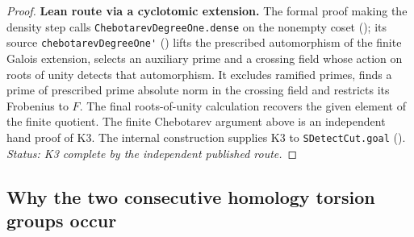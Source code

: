 \begin{proof}
\par\noindent\textbf{Lean route via a cyclotomic extension.} 
The formal proof making the density step calls \nolinkurl{ChebotarevDegreeOne.dense} on the nonempty
coset (); its source
\nolinkurl{chebotarevDegreeOne'} ()
lifts the prescribed automorphism of the finite Galois extension,
selects an auxiliary prime and a crossing field whose action on roots
of unity detects that automorphism. It excludes ramified primes, finds a
prime of prescribed prime absolute norm in the crossing field and restricts
its Frobenius to $F$. The final roots-of-unity calculation recovers the
given element of the finite quotient. The finite Chebotarev argument
above is an independent hand proof of K3. The internal construction
supplies K3 to \nolinkurl{SDetectCut.goal}
().
\emph{Status: K3 complete by the independent published route.}
\end{proof}

\subsection{Why the two consecutive homology torsion groups occur}
\label{sec:P-k-bock}

